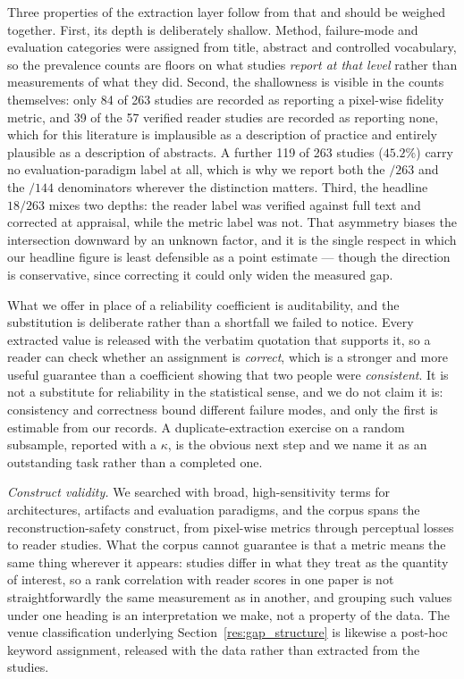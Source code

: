 \documentclass[review,authoryear]{elsarticle}
\begin{document}
Three properties of the extraction layer follow from that and should be weighed together.
First, its depth is deliberately shallow. Method, failure-mode and evaluation categories
were assigned from title, abstract and controlled vocabulary, so the prevalence counts are
floors on what studies \emph{report at that level} rather than measurements of what they
did. Second, the shallowness is visible in the counts themselves: only 84 of 263 studies
are recorded as reporting a pixel-wise fidelity metric, and 39 of the 57 verified reader
studies are recorded as reporting none, which for this literature is implausible as a
description of practice and entirely plausible as a description of abstracts. A further
119 of 263 studies ($45.2\%$) carry no evaluation-paradigm label at all, which is why we
report both the $/263$ and the $/144$ denominators wherever the distinction matters. Third,
the headline $18/263$ mixes two depths: the reader label was verified against full text and
corrected at appraisal, while the metric label was not. That asymmetry biases the
intersection downward by an unknown factor, and it is the single respect in which our
headline figure is least defensible as a point estimate --- though the direction is
conservative, since correcting it could only widen the measured gap.

What we offer in place of a reliability coefficient is auditability, and the substitution is
deliberate rather than a shortfall we failed to notice. Every extracted value is released
with the verbatim quotation that supports it, so a reader can check whether an assignment is
\emph{correct}, which is a stronger and more useful guarantee than a coefficient showing
that two people were \emph{consistent}. It is not a substitute for reliability in the
statistical sense, and we do not claim it is: consistency and correctness bound different
failure modes, and only the first is estimable from our records. A duplicate-extraction
exercise on a random subsample, reported with a $\kappa$, is the obvious next step and we
name it as an outstanding task rather than a completed one.

\emph{Construct validity.} We searched with broad, high-sensitivity terms for
architectures, artifacts and evaluation paradigms, and the corpus spans the
reconstruction-safety construct, from pixel-wise metrics through perceptual losses to
reader studies. What the corpus cannot guarantee is that a metric means the same thing
wherever it appears: studies differ in what they treat as the quantity of interest, so
a rank correlation with reader scores in one paper is not straightforwardly the same
measurement as in another, and grouping such values under one heading is an
interpretation we make, not a property of the data. The venue classification
underlying Section~\ref{res:gap_structure} is likewise a post-hoc keyword assignment,
released with the data rather than extracted from the studies.
\end{document}
